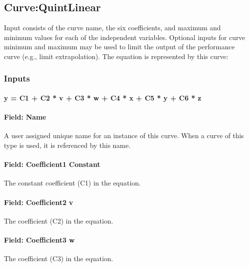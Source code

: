 \subsection{Curve:QuintLinear}\label{curvequintlinear}

Input consists of the curve name, the six coefficients, and maximum and minimum values for each of the independent variables. Optional inputs for curve minimum and maximum may be used to limit the output of the performance curve (e.g., limit extrapolation). The equation is represented by this curve:

\subsubsection{Inputs}\label{inputs-2-050}

\paragraph{y = C1 + C2 * v + C3 * w + C4 * x + C5 * y + C6 * z}\label{y-c1-c2-v-c3-w-c4-x-c5-y-c6-z}

\paragraph{Field: Name}\label{field-name-2-046}

A user assigned unique name for an instance of this curve. When a curve of this type is used, it is referenced by this name.

\paragraph{Field: Coefficient1 Constant}\label{field-coefficient1-constant-11}

The constant coefficient (C1) in the equation.

\paragraph{Field: Coefficient2 v}\label{field-coefficient2-v}

The coefficient (C2) in the equation.

\paragraph{Field: Coefficient3 w}\label{field-coefficient3-w}

The coefficient (C3) in the equation.

